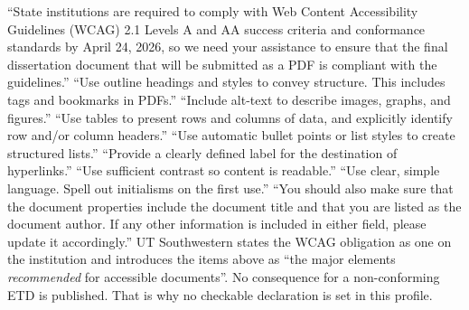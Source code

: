 %
%
	{``State institutions are required to comply with Web Content Accessibility
	 Guidelines (WCAG) 2.1 Levels A and AA success criteria and conformance
	 standards by April 24, 2026, so we need your assistance to ensure that the
	 final dissertation document that will be submitted as a PDF is compliant
	 with the guidelines.''}
	{``Use outline headings and styles to convey structure. This includes tags
	 and bookmarks in PDFs.''}
	{``Include alt-text to describe images, graphs, and figures.''}
	{``Use tables to present rows and columns of data, and explicitly identify
	 row and/or column headers.''}
	{``Use automatic bullet points or list styles to create structured lists.''
	 ``Provide a clearly defined label for the destination of hyperlinks.''
	 ``Use sufficient contrast so content is readable.'' ``Use clear, simple
	 language. Spell out initialisms on the first use.''}
	{``You should also make sure that the document properties include the
	 document title and that you are listed as the document author. If any other
	 information is included in either field, please update it accordingly.''}
	{UT Southwestern states the WCAG obligation as one on the institution and
	 introduces the items above as ``the major elements \emph{recommended} for
	 accessible documents''. No consequence for a non-conforming ETD is
	 published. That is why no checkable declaration is set in this profile.}

